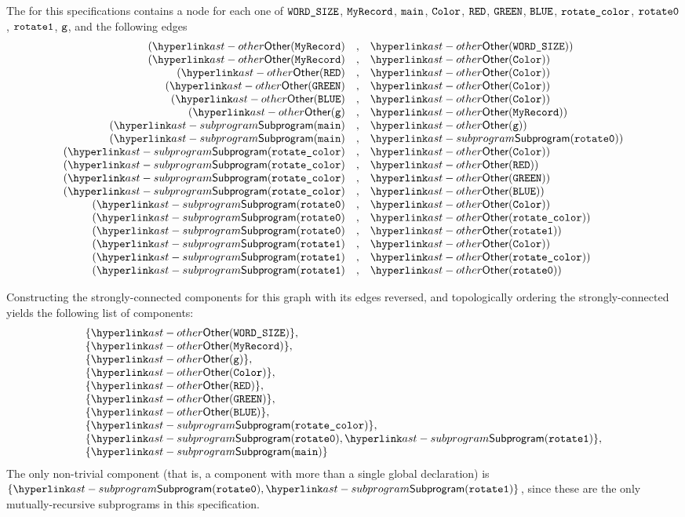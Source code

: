 The \dependencygraphterm{} for this specifications contains a node for each one of
$\texttt{WORD\_SIZE}$, $\texttt{MyRecord}$, $\texttt{main}$,
$\texttt{Color}$, $\texttt{RED}$, $\texttt{GREEN}$, $\texttt{BLUE}$,
$\texttt{rotate\_color}$, $\texttt{rotate0}$, $\texttt{rotate1}$, $\texttt{g}$,
and the following edges
\[
\begin{array}{rcl}
  (\Other(\MyRecord)    &,& \Other(\vWORDSIZE))\\
  (\Other(\MyRecord)    &,& \Other(\Color))\\
  (\Other(\RED)       &,& \Other(\Color))\\
  (\Other(\GREEN)       &,& \Other(\Color))\\
  (\Other(\BLUE)       &,& \Other(\Color))\\
  (\Other(\vg)       &,& \Other(\MyRecord))\\
  (\Subprogram(\vmain)  &,& \Other(\vg))\\
  (\Subprogram(\vmain)  &,& \Subprogram(\rotatezero))\\
  (\Subprogram(\rotatecolor)   &,& \Other(\Color))\\
  (\Subprogram(\rotatecolor)   &,& \Other(\RED))\\
  (\Subprogram(\rotatecolor)   &,& \Other(\GREEN))\\
  (\Subprogram(\rotatecolor)   &,& \Other(\BLUE))\\
  (\Subprogram(\rotatezero)    &,& \Other(\Color))\\
  (\Subprogram(\rotatezero)    &,& \Other(\rotatecolor))\\
  (\Subprogram(\rotatezero)    &,& \Other(\rotateone))\\
  (\Subprogram(\rotateone)     &,& \Other(\Color))\\
  (\Subprogram(\rotateone)     &,& \Other(\rotatecolor))\\
  (\Subprogram(\rotateone)     &,& \Other(\rotatezero))\\
\end{array}
\]

Constructing the strongly-connected components for this graph with its edges reversed,
and topologically ordering the strongly-connected yields the following list of
components:
\[
\begin{array}{l}
  \{ \Other(\vWORDSIZE) \},\\
  \{ \Other(\MyRecord) \},\\
  \{ \Other(\vg) \},\\
  \{ \Other(\Color) \},\\
  \{ \Other(\RED) \},\\
  \{ \Other(\GREEN) \},\\
  \{ \Other(\BLUE) \},\\
  \{ \Subprogram(\rotatecolor) \},\\
  \{ \Subprogram(\rotatezero), \Subprogram(\rotateone) \},\\
  \{ \Subprogram(\vmain) \}
\end{array}
\]
The only non-trivial component (that is, a component with more than a single global declaration)
is $\{ \Subprogram(\rotatezero), \Subprogram(\rotateone) \}$, since these are the only
mutually-recursive subprograms in this specification.

